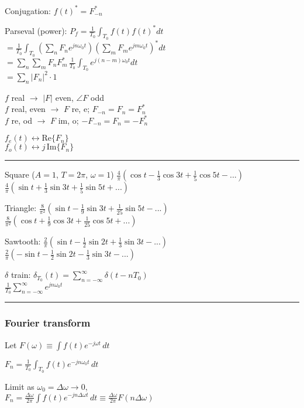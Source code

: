 \documentclass[4pt]{article}
\theoremstyle{definition}
\theoremstyle{definition}
\renewcommand{\o}{\omega}
\begin{document}
\begin{multicols}{3}
    Conjugation: $f(t)^* = F^*_{-n}$

    Parseval (power): \(P_f = \frac 1{T_0}\int_{T_0} f(t) f(t)^* dt\)\\
    \(=\frac{1}{T_0}\int_{T_0} (\sum_n F_n e^{jn\o_0t})(\sum_m F_m e^{jm\o_0t})^* dt\)\\
    \(=\sum_n \sum_m  F_n F_m^* \, \frac{1}{T_0}\int_{T_0} e^{j(n-m)\o_0t} dt\)\\
    \(=\sum_n |F_n|^2 \cdot 1\)

        $f$ real $\rightarrow$ $|F|$ even, $\angle F$ odd\\
        $f$ real, even $\rightarrow$ $F$ re, e; $F_{-n} = F_n = F_n^*$\\
        $f$ re, od $\rightarrow$ $F$ im, o; $-F_{-n} = F_n = -F_n^*$

        $f_e(t) \leftrightarrow \mathrm{Re}\{ F_n\}$\\
        $f_o(t) \leftrightarrow j \,\mathrm{Im} \{F_n\}$
\rule{\linewidth}{0.5pt}
    Square ($A=1$, $T=2\pi$, $\omega = 1$) 
        $\frac{4}{\pi}(\cos t - \frac{1}{3}\cos 3t + \frac{1}{5} \cos 5t- ...)$\\
        $\frac{4}{\pi}(\sin t + \frac 1 3 \sin 3t + \frac 1 5 \sin 5t + ...)$

    Triangle: 
        $\frac{8}{\pi^2}(\sin t - \frac{1}{9} \sin 3t + \frac{1}{25} \sin 5t - ...)$\\
        $\frac{8}{\pi^2}(\cos t + \frac 1 9 \cos 3t + \frac 1 {25} \cos 5t + ...)$

    Sawtooth:   
        $\frac 2{\pi} (\sin t - \frac{1}{2} \sin 2t + \frac{1}{3} \sin 3t - ...)$\\
        $\frac 2{\pi} (-\sin t - \frac{1}{2} \sin 2t - \frac{1}{3} \sin 3t - ...)$

    $\delta$ train:     
        $\delta_{T_0} (t) = \sum_{n=-\infty}^{\infty} \delta(t - nT_0)$ \\
        $\frac{1}{T_0} \sum_{n=-\infty}^{\infty} e^{jn\omega_0 t}$

\rule{\linewidth}{0.5pt}
\newline
\subsubsection{Fourier transform}
    Let \(F(\omega) \equiv \int f(t) e^{-j\omega t} \, dt\)

    \(F_n = \frac 1 {T_0} \int_{T_0} f(t) e^{-jn\omega_0 t} \, dt\)

    Limit as $\omega_0 =\Delta\omega \rightarrow 0$,\\
    \(F_n = \frac {\Delta\omega}{2\pi} \int f(t) e^{-jn\Delta\omega t} \, dt
    \equiv \frac{\Delta\omega}{2\pi} F(n\Delta\omega)\) %


\end{multicols}
\end{document}
